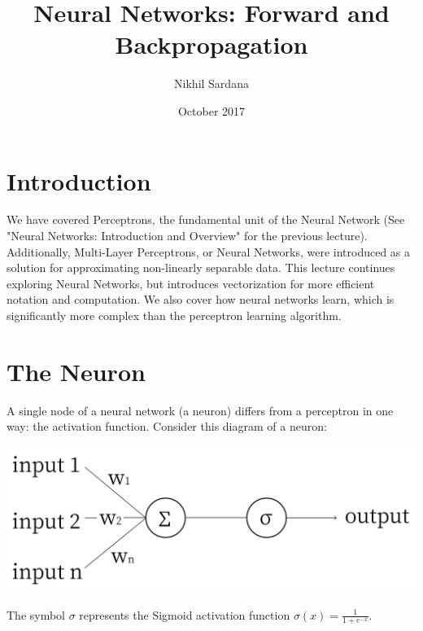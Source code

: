 \documentclass{article}
\title{Neural Networks: Forward and Backpropagation}
\author{ Nikhil Sardana }
\date{October 2017}
\begin{document}
\maketitle

\section{Introduction}

We have covered Perceptrons, the fundamental unit of the Neural Network (See "Neural Networks: Introduction and Overview" for the previous lecture). Additionally, Multi-Layer Perceptrons, or Neural Networks, were introduced as a solution for approximating non-linearly separable data. This lecture continues exploring Neural Networks, but introduces vectorization for more efficient notation and computation. We also cover how neural networks learn, which is significantly more complex than the perceptron learning algorithm. 
\section{The Neuron}
A single node of a neural network (a neuron) differs from a perceptron in one way: the activation function. Consider this diagram of a neuron:
\begin{center}
\includegraphics[scale=0.3]{neuron}
\end{center}

The symbol $\sigma$ represents the Sigmoid activation function $\sigma(x) = \frac{1}{1 + e^{-x}}$.
\end{document}
